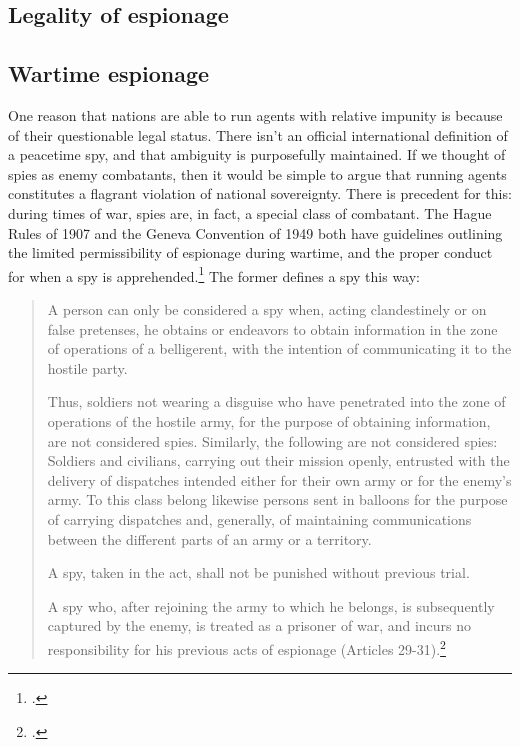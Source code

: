 \documentclass{memoir}
\begin{document}
\begin{refsegment}

\section{Legality of espionage}
\subsection{Wartime espionage}
One reason that nations are able to run agents with relative impunity is because of their questionable legal status. There isn't an official international definition of a peacetime spy, and that ambiguity is purposefully maintained. If we thought of spies as enemy combatants, then it would be simple to argue that running agents constitutes a flagrant violation of national sovereignty. There is precedent for this: during times of war, spies are, in fact, a special class of combatant. The Hague Rules of 1907 and the Geneva Convention of 1949 both have guidelines outlining the limited permissibility of espionage during wartime, and the proper conduct for when a spy is apprehended.\footcite[p.~652]{beim_enforcing_2018} The former defines a spy this way:

\begin{quote}
A person can only be considered a spy when, acting clandestinely or on false pretenses, he obtains or endeavors to obtain information in the zone of operations of a belligerent, with the intention of communicating it to the hostile party.

Thus, soldiers not wearing a disguise who have penetrated into the zone of operations of the hostile army, for the purpose of obtaining information, are not considered spies. Similarly, the following are not considered spies: Soldiers and civilians, carrying out their mission openly, entrusted with the delivery of dispatches intended either for their own army or for the enemy's army. To this class belong likewise persons sent in balloons for the purpose of carrying dispatches and, generally, of maintaining communications between the different parts of an army or a territory.

A spy, taken in the act, shall not be punished without previous trial.

A spy who, after rejoining the army to which he belongs, is subsequently captured by the enemy, is treated as a prisoner of war, and incurs no responsibility for his previous acts of espionage (Articles 29-31).\footcite{noauthor_hague_1907}
\end{quote}


\end{refsegment}
\end{document}
